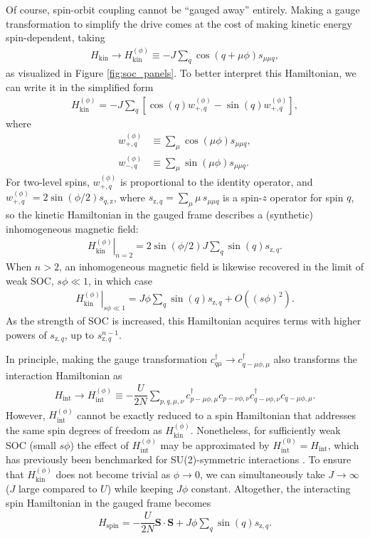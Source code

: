 \documentclass[nofootinbib,twocolumn]{revtex4-2}
\renewcommand{\t}{\text} %
\newcommand{\f}[2]{\dfrac{#1}{#2}} %
\newcommand{\p}[1]{\left(#1\right)} %
\renewcommand{\sp}[1]{\left[#1\right]} %
\renewcommand{\v}{\bm} %
\renewcommand{\c}{\cdot} %
\newcommand{\1}{\mathds{1}}
\newcommand{\z}{\text{z}}
\begin{document}
Of course, spin-orbit coupling cannot be ``gauged away'' entirely.
Making a gauge transformation to simplify the drive comes at the cost of making kinetic energy spin-dependent, taking
\begin{align}
  H_{\t{kin}} \to H_{\t{kin}}^{(\phi)}
  \equiv -J \sum_q \cos\p{q+\mu\phi} s_{\mu\mu q},
\end{align}
as visualized in Figure \ref{fig:soc_panels}.
To better interpret this Hamiltonian, we can write it in the simplified form
\begin{align}
  H_{\t{kin}}^{(\phi)}
  = -J \sum_q
  \sp{\cos\p{q} w_{+,q}^{(\phi)} - \sin\p{q} w_{+,q}^{(\phi)}},
\end{align}
where
\begin{align}
  w_{+,q}^{(\phi)} &\equiv \sum_\mu \cos\p{\mu\phi} s_{\mu\mu q}, \\
  w_{-,q}^{(\phi)} &\equiv \sum_\mu \sin\p{\mu\phi} s_{\mu\mu q}.
\end{align}
For two-level spins, $w_{+,q}^{(\phi)}$ is proportional to the identity operator, and $w_{+,q}^{(\phi)}=2\sin\p{\phi/2} s_{q,\z}$, where $s_{\z,q}=\sum_\mu \mu\, s_{\mu\mu q}$ is a spin-$z$ operator for spin $q$, so the kinetic Hamiltonian in the gauged frame describes a (synthetic) inhomogeneous magnetic field:
\begin{align}
  \left. H_{\t{kin}}^{(\phi)} \right|_{n=2}
  = 2\sin\p{\phi/2} J \sum_q \sin\p{q} s_{\z,q}.
\end{align}
When $n>2$, an inhomogeneous magnetic field is likewise recovered in the limit of weak SOC, $s\phi\ll1$, in which case
\begin{align}
  \left. H_{\t{kin}}^{(\phi)} \right|_{s\phi\ll1}
  = J\phi \sum_q \sin\p{q} s_{\z,q} + O\p{(s\phi)^2}.
\end{align}
As the strength of SOC is increased, this Hamiltonian acquires terms with higher powers of $s_{\z,q}$, up to $s_{\z,q}^{n-1}$.

In principle, making the gauge transformation $c_{q\mu}^\dag\to c_{q-\mu\phi,\mu}^\dag$ also transforms the interaction Hamiltonian as
\begin{align}
  H_{\t{int}} \to H_{\t{int}}^{(\phi)}
  \equiv -\f{U}{2N} \sum_{p,q,\mu,\nu}
  c_{p-\mu\phi,\mu}^\dag c_{p-\nu\phi,\nu}
  c_{q-\nu\phi,\nu}^\dag c_{q-\mu\phi,\mu}.
\end{align}
However, $H_{\t{int}}^{(\phi)}$ cannot be exactly reduced to a spin Hamiltonian that addresses the same spin degrees of freedom as $H_{\t{kin}}^{(\phi)}$.
Nonetheless, for sufficiently weak SOC (small $s\phi$) the effect of $H_{\t{int}}^{(\phi)}$ may be approximated by $H_{\t{int}}^{(0)}=H_{\t{int}}$, which has previously been benchmarked for SU(2)-symmetric interactions \cite{he2019engineering, smale2019observation}.
To ensure that $H_{\t{kin}}^{(\phi)}$ does not become trivial as $\phi\to0$, we can simultaneously take $J\to\infty$ ($J$ large compared to $U$) while keeping $J\phi$ constant.
Altogether, the interacting spin Hamiltonian in the gauged frame becomes
\begin{align}
  H_{\t{spin}} = -\f{U}{2N} \v S\c\v S + J\phi \sum_q \sin\p{q} s_{\z,q}.
  \label{eq:H_spin}
\end{align}
\end{document}
